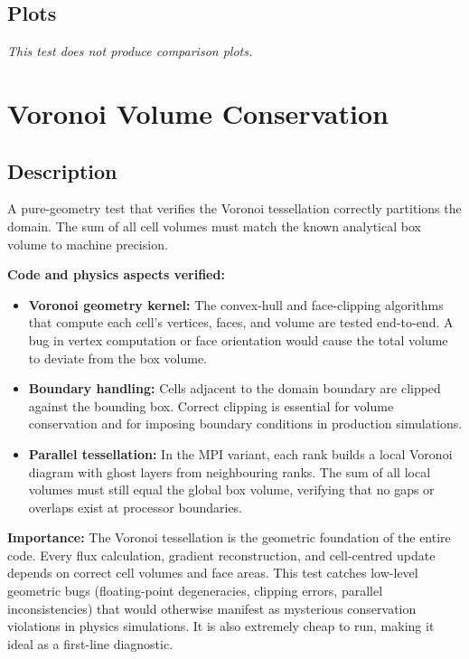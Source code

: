 \documentclass[11pt,a4paper]{article}
\begin{document}
\subsection*{Plots}
\textit{This test does not produce comparison plots.}

\newpage

\section{Voronoi Volume Conservation}
\label{sec:voronoi_volume}

\subsection*{Description}
A pure-geometry test that verifies the Voronoi tessellation correctly partitions the domain. The sum of all cell volumes must match the known analytical box volume to machine precision.

\textbf{Code and physics aspects verified:}
\begin{itemize}
  \item \textbf{Voronoi geometry kernel:} The convex-hull and face-clipping algorithms that compute each cell's vertices, faces, and volume are tested end-to-end. A bug in vertex computation or face orientation would cause the total volume to deviate from the box volume.
  \item \textbf{Boundary handling:} Cells adjacent to the domain boundary are clipped against the bounding box. Correct clipping is essential for volume conservation and for imposing boundary conditions in production simulations.
  \item \textbf{Parallel tessellation:} In the MPI variant, each rank builds a local Voronoi diagram with ghost layers from neighbouring ranks. The sum of all local volumes must still equal the global box volume, verifying that no gaps or overlaps exist at processor boundaries.
\end{itemize}

\textbf{Importance:} The Voronoi tessellation is the geometric foundation of the entire code. Every flux calculation, gradient reconstruction, and cell-centred update depends on correct cell volumes and face areas. This test catches low-level geometric bugs (floating-point degeneracies, clipping errors, parallel inconsistencies) that would otherwise manifest as mysterious conservation violations in physics simulations. It is also extremely cheap to run, making it ideal as a first-line diagnostic.
\end{document}
